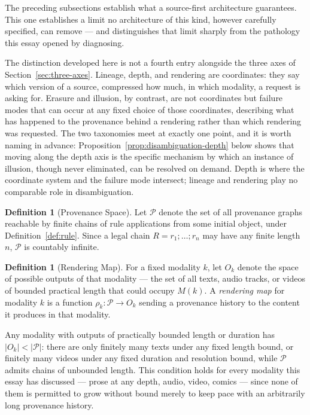 \documentclass[11pt]{article}
\theoremstyle{definition}
\newtheorem{definition}[theorem]{Definition}
\begin{document}
The preceding subsections establish what a source-first architecture guarantees. This one establishes a limit no architecture of this kind, however carefully specified, can remove --- and distinguishes that limit sharply from the pathology this essay opened by diagnosing.

The distinction developed here is not a fourth entry alongside the three axes of Section~\ref{sec:three-axes}. Lineage, depth, and rendering are coordinates: they say which version of a source, compressed how much, in which modality, a request is asking for. Erasure and illusion, by contrast, are not coordinates but failure modes that can occur at any fixed choice of those coordinates, describing what has happened to the provenance behind a rendering rather than which rendering was requested. The two taxonomies meet at exactly one point, and it is worth naming in advance: Proposition~\ref{prop:disambiguation-depth} below shows that moving along the depth axis is the specific mechanism by which an instance of illusion, though never eliminated, can be resolved on demand. Depth is where the coordinate system and the failure mode intersect; lineage and rendering play no comparable role in disambiguation.

\begin{definition}[Provenance Space]
\label{def:provenance-space}
Let $\mathcal{P}$ denote the set of all provenance graphs reachable by finite chains of rule applications from some initial object, under Definition~\ref{def:rule}. Since a legal chain $R = r_1; \dots; r_n$ may have any finite length $n$, $\mathcal{P}$ is countably infinite.
\end{definition}

\begin{definition}[Rendering Map]
\label{def:rendering-map}
For a fixed modality $k$, let $O_k$ denote the space of possible outputs of that modality --- the set of all texts, audio tracks, or videos of bounded practical length that could occupy $M(k)$. A \emph{rendering map} for modality $k$ is a function $\rho_k : \mathcal{P} \to O_k$ sending a provenance history to the content it produces in that modality.
\end{definition}

Any modality with outputs of practically bounded length or duration has $|O_k| < |\mathcal{P}|$: there are only finitely many texts under any fixed length bound, or finitely many videos under any fixed duration and resolution bound, while $\mathcal{P}$ admits chains of unbounded length. This condition holds for every modality this essay has discussed --- prose at any depth, audio, video, comics --- since none of them is permitted to grow without bound merely to keep pace with an arbitrarily long provenance history.
\end{document}
